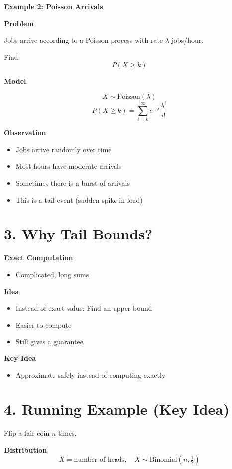 \documentclass[12pt]{article}
\begin{document}
\textbf{Example 2: Poisson Arrivals}

\textbf{Problem}

Jobs arrive according to a Poisson process with rate $\lambda$ jobs/hour.

Find:
\[
P(X \geq k)
\]

\textbf{Model}

\[
X \sim \text{Poisson}(\lambda)
\]
\[
P(X \geq k) = \sum_{i=k}^{\infty} e^{-\lambda} \frac{\lambda^i}{i!}
\]

\textbf{Observation}
\begin{itemize}
\item Jobs arrive randomly over time
\item Most hours have moderate arrivals
\item Sometimes there is a burst of arrivals
\item This is a tail event (sudden spike in load)
\end{itemize}

\section*{3. Why Tail Bounds?}

\textbf{Exact Computation}
\begin{itemize}
\item Complicated, long sums
\end{itemize}

\textbf{Idea}
\begin{itemize}
\item Instead of exact value: Find an upper bound
\item Easier to compute
\item Still gives a guarantee
\end{itemize}

\textbf{Key Idea}
\begin{itemize}
\item Approximate safely instead of computing exactly
\end{itemize}

\section*{4. Running Example (Key Idea)}

Flip a fair coin $n$ times.

\textbf{Distribution}
\[
X = \text{number of heads}, \quad X \sim \text{Binomial}(n, \tfrac{1}{2})
\]
\end{document}
